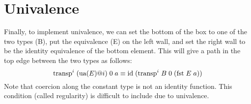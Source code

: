 \documentclass[11pt]{article}
\newcommand{\transptt}{\ensuremath{\textnormal{transp}}}
\begin{document}
\section{Univalence}
Finally, to implement univalence, we can set the bottom of the box to one of the two types (B), put the equivalence (E) on the left wall, and set the right wall to be the identity equivalence of the bottom element. This will give a path in the top edge between the two types as follows: $$\transptt^i \; (\text{ua}(E)@i) \; 0 \; a \equiv \text{id} \;(\transptt^i \; B \; 0 \; (\text{fst} \; E \; a))$$ Note that coercion along the constant type is not an identity function. This condition (called regularity) is difficult to include due to univalence.
\end{document}
